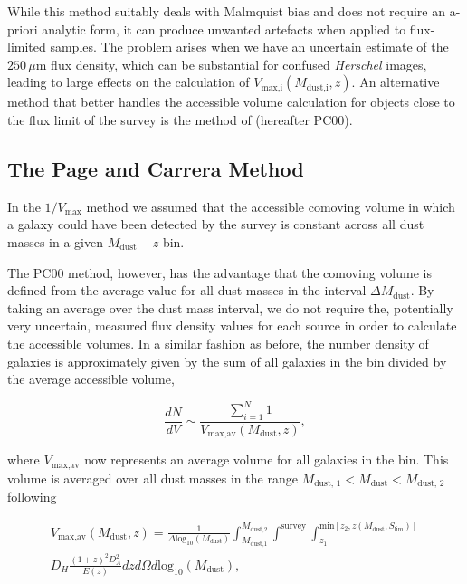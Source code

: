 While this method suitably deals with Malmquist bias and does not require an a-priori analytic form, it can produce unwanted artefacts when applied to flux-limited samples. The problem arises when we have an uncertain estimate of the $250\,\mu$m flux density, which can be substantial for confused \textit{Herschel} images, leading to large effects on the calculation of $V_{\textrm{max,i}}(M_{\textrm{dust,i}},z)$. An alternative method that better handles the accessible volume calculation for objects close to the flux limit of the survey is the method of \citealt{Page_2000} (hereafter PC00).

\subsection{The Page and Carrera Method}

In the $1/V_{\textrm{max}}$ method we assumed that the accessible comoving volume in which a galaxy could have been detected by the survey is constant across all dust masses in a given $M_{\textrm{dust}} - z$ bin.

The PC00 method, however, has the advantage that the comoving volume is defined from the average value for all dust masses in the interval $\Delta M_{\textrm{dust}}$. By taking an average over the dust mass interval, we do not require the, potentially very uncertain, measured flux density values for each source in order to calculate the accessible volumes. In a similar fashion as before, the number density of galaxies is approximately given by the sum of all galaxies in the bin divided by the average accessible volume, 

\begin{equation}
    \frac{dN}{dV} \sim \frac{\sum_{i=1}^N 1}{V_{\textrm{max,av}}(M_{\textrm{dust}},z)},
\label{eq:number_density_pc00_method}
\end{equation}

\noindent where $V_{\textrm{max,av}}$ now represents an average volume for all galaxies in the bin. This volume is averaged over all dust masses in the range $M_{\textrm{dust, 1}} < M_{\textrm{dust}} < M_{\textrm{dust, 2}}$ following

\begin{multline}
    V_{\textrm{max,av}}(M_{\textrm{dust}},z) = \frac{1}{\Delta \textrm{log}_{10}(M_\textrm{dust})}\int_{\scriptscriptstyle M_{\textrm{dust,1}}}^{\scriptscriptstyle M_{\textrm{dust,2}}} \int^{\scriptscriptstyle \textrm{survey}} \int_{\scriptscriptstyle z_1}^{\scriptscriptstyle \textrm{min}[z_2, z(M_{\textrm{dust}},S_{\textrm{lim}})]} \\ D_H \frac{(1+z)^2 D_A^2}{E(z)} dz d\Omega d\textrm{log}_{10}(M_\textrm{dust}),
\label{eq:volume_pc00_method}
\end{multline}

